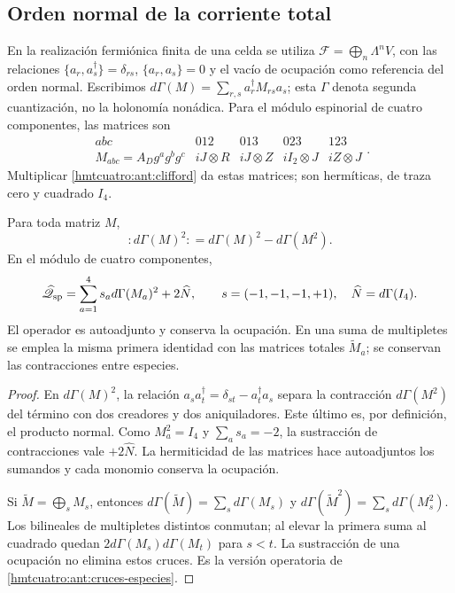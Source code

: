 \subsection{Orden normal de la corriente total}
\label{hmtcuatro:ant:car}

En la realización fermiónica finita de una celda se utiliza
\(\mathcal F=\bigoplus_n\Lambda^n V\), con las relaciones
\(\{a_r,a_s^\dagger\}=\delta_{rs}\), \(\{a_r,a_s\}=0\) y el
vacío de ocupación como referencia del orden normal.
Escribimos \(d\Gamma(M)=\sum_{r,s}a_r^\dagger M_{rs}a_s\);
esta \(\Gamma\) denota segunda cuantización, no la holonomía nonádica.
Para el módulo espinorial de cuatro componentes, las matrices son
\[
 \begin{array}{c|cccc}
 abc&012&013&023&123\\ \hline
 M_{abc}=A_Dg^ag^bg^c&
 iJ\otimes R&iJ\otimes Z&iI_2\otimes J&iZ\otimes J
 \end{array}.
\]
Multiplicar \eqref{hmtcuatro:ant:clifford} da estas matrices;
son hermíticas, de traza cero y cuadrado \(I_4\).

\begin{proposition}
\label{hmtcuatro:ant:orden-normal}
Para toda matriz \(M\),
\[
 :d\Gamma(M)^2:
 =d\Gamma(M)^2-d\Gamma(M^2).
\]
En el módulo de cuatro componentes,
\[
 \widehat{\mathscr Q}_{\rm sp}
 =\sum_{a=1}^4s_a d\Gamma(M_a)^2+2\widehat N,
 \qquad s=(-1,-1,-1,+1),\quad \widehat N=d\Gamma(I_4).
\]
El operador es autoadjunto y conserva la ocupación.
En una suma de multipletes se emplea la misma primera identidad
con las matrices totales \(\widetilde M_a\); se conservan las
contracciones entre especies.
\end{proposition}
\begin{proof}
En \(d\Gamma(M)^2\), la relación
\(a_sa_t^\dagger=\delta_{st}-a_t^\dagger a_s\) separa la
contracción \(d\Gamma(M^2)\) del término con dos creadores y
dos aniquiladores. Este último es, por definición, el producto
normal. Como \(M_a^2=I_4\) y \(\sum_a s_a=-2\), la sustracción
de contracciones vale \(+2\widehat N\). La hermiticidad de las
matrices hace autoadjuntos los sumandos y cada monomio conserva
la ocupación.

Si \(\widetilde M=\bigoplus_s M_s\), entonces
\(d\Gamma(\widetilde M)=\sum_s d\Gamma(M_s)\) y
\(d\Gamma(\widetilde M^2)=\sum_s d\Gamma(M_s^2)\).
Los bilineales de multipletes distintos conmutan; al elevar la
primera suma al cuadrado quedan
\(2d\Gamma(M_s)d\Gamma(M_t)\) para \(s<t\). La sustracción de
una ocupación no elimina estos cruces. Es la versión operatoria
de \eqref{hmtcuatro:ant:cruces-especies}.
\end{proof}

